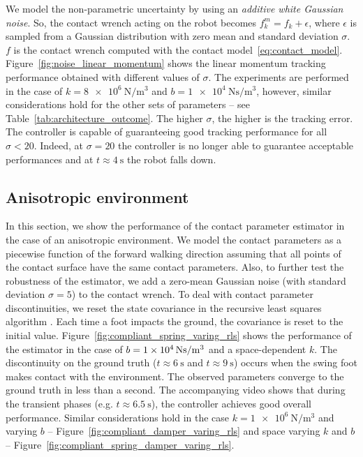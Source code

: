 We model the non-parametric uncertainty by using an \emph{additive white Gaussian noise}. So, the contact wrench acting on the robot becomes $f_k^m = f_k + \epsilon$, where $\epsilon$ is sampled from a Gaussian distribution with zero mean and standard deviation $\sigma$. $f$ is the contact wrench computed with the contact model~\eqref{eq:contact_model}.
Figure~\ref{fig:noise_linear_momentum} shows the linear momentum tracking performance obtained with different values of $\sigma$. The experiments are performed in the case of $k = \SI{8e6}{\newton \per \meter^3}$ and $b = \SI{1e4}{\newton \second \per \meter^3}$, however, similar considerations hold for the other sets of parameters -- see Table~\ref{tab:architecture_outcome}. 
The higher $\sigma$, the higher is the tracking error. The controller is capable of guaranteeing good tracking performance for all $\sigma < 20$. Indeed, at $\sigma = 20$ the controller is no longer able to guarantee acceptable performances and at $t\approx\SI{4}{\second}$ the robot falls down. 


\subsection{Anisotropic environment}
In this section, we show the performance of the contact parameter estimator in the case of an anisotropic environment. 
We model the contact parameters as a piecewise function of the forward walking direction assuming that all points of the contact surface have the same contact parameters. Also, to further test the robustness of the estimator, we add a zero-mean Gaussian noise (with standard deviation $\sigma = 5$) to the contact wrench.
To deal with contact parameter discontinuities, we reset the state covariance in the recursive least squares algorithm \citep{Colman2006OnDiscontinuities}. Each time a foot impacts the ground, the covariance is reset to the initial value. 
Figure~\ref{fig:compliant_spring_varing_rls} shows the performance of the estimator in the case of $b=\SI{1E4}{\newton\second\per\meter^3}$ and a space-dependent $k$. The discontinuity on the ground truth ($t\approx\SI{6}{\second}$ and $t\approx\SI{9}{\second}$) occurs when the swing foot makes contact with the environment. The observed parameters converge to the ground truth in less than a second.
The accompanying video shows that during the transient phases (e.g. $t\approx\SI{6.5}{\second}$), the controller achieves good overall performance.
Similar considerations hold in the case $k=\SI{1e6}{\newton\per\meter^3}$ and varying $b$ -- Figure~\ref{fig:compliant_damper_varing_rls} and space varying $k$ and $b$ -- Figure~\ref{fig:compliant_spring_damper_varing_rls}.